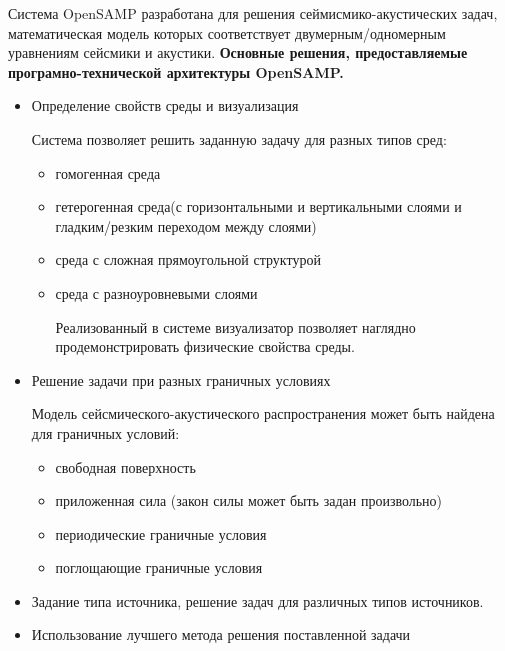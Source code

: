 \documentclass{article}
\begin{document}
Система OpenSAMP разработана для решения сеймисмико-акустических задач, математическая модель которых соответствует двумерным/одномерным уравнениям сейсмики и акустики.
\newline
\newline
\textbf{Основные решения, предоставляемые програмно-технической архитектуры OpenSAMP.}
\begin{itemize}
\item  Определение свойств среды и визуализация

Система позволяет решить заданную задачу для разных типов сред:
\begin{itemize}
\item гомогенная среда
\item гетерогенная среда(с горизонтальными и вертикальными слоями и гладким/резким переходом между слоями)
\item среда с сложная прямоугольной структурой
\item среда с разноуровневыми слоями

Реализованный в системе визуализатор позволяет наглядно продемонстрировать физические свойства среды.

\end{itemize}
\item Решение задачи при разных граничных условиях

Модель сейсмического-акустического распространения может быть найдена для граничных условий:
\begin{itemize}

\item свободная поверхность 
\item приложенная сила (закон силы может быть задан произвольно)
\item периодические граничные условия
\item поглощающие граничные условия

\end{itemize}
\item Задание типа источника, решение задач для различных типов источников.
\item Использование лучшего метода решения поставленной задачи 


\end{itemize}
\end{document}

